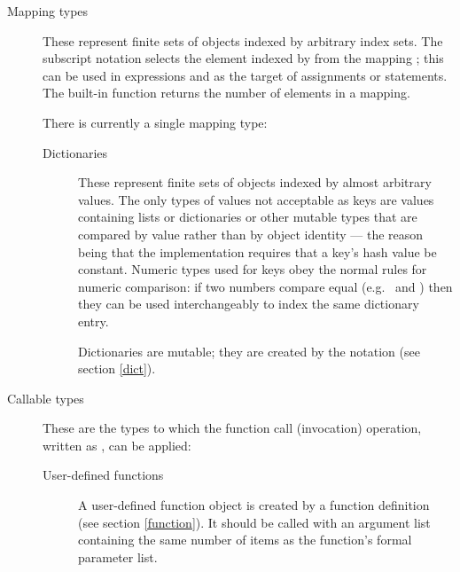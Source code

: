 \begin{description}
\begin{description}
\begin{description}
\end{description} %

\end{description} %

\item[Mapping types]
These represent finite sets of objects indexed by arbitrary index sets.
The subscript notation  selects the element indexed
by  from the mapping ; this can be used in
expressions and as the target of assignments or  statements.
The built-in function  returns the number of elements
in a mapping.

There is currently a single mapping type:

\begin{description}

\item[Dictionaries]
These represent finite sets of objects indexed by almost arbitrary
values.  The only types of values not acceptable as keys are values
containing lists or dictionaries or other mutable types that are
compared by value rather than by object identity --- the reason being
that the implementation requires that a key's hash value be constant.
Numeric types used for keys obey the normal rules for numeric
comparison: if two numbers compare equal (e.g.\  and
) then they can be used interchangeably to index the same
dictionary entry.

Dictionaries are mutable; they are created by the 
notation (see section \ref{dict}).

\end{description} %

\item[Callable types]
These are the types to which the function call (invocation) operation,
written as , can be applied:

\begin{description}

\item[User-defined functions]
A user-defined function object is created by a function definition
(see section \ref{function}).  It should be called with an argument
list containing the same number of items as the function's formal
parameter list.


\end{description}
\end{description}

